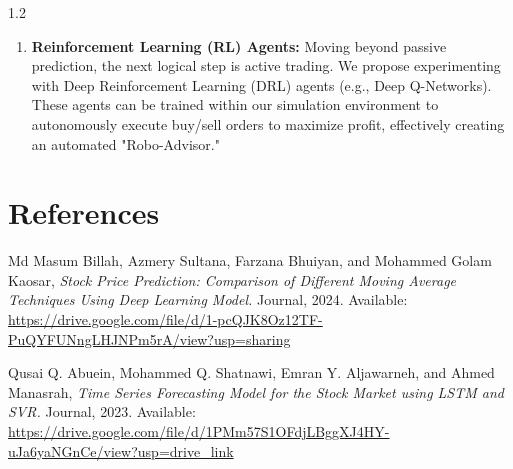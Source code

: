 \documentclass[12pt, a4paper]{report}
\begin{document}
\begin{spacing}{1.2}
\begin{enumerate}
    \item \textbf{Reinforcement Learning (RL) Agents:} 
    Moving beyond passive prediction, the next logical step is active trading. We propose experimenting with Deep Reinforcement Learning (DRL) agents (e.g., Deep Q-Networks). These agents can be trained within our simulation environment to autonomously execute buy/sell orders to maximize profit, effectively creating an automated "Robo-Advisor."
\end{enumerate}

\vspace{-3cm}
\renewcommand{\bibname}{}%


\chapter*{References}

\vspace{-0.8cm}

\begingroup
\footnotesize

\def\UrlBreaks{\do\/\do-\do\_\do\?\do\=\do\&\do\a\do\b\do\c\do\d\do\e\do\f\do\g\do\h\do\i\do\j\do\k\do\l\do\m\do\n\do\o\do\p\do\q\do\r\do\s\do\t\do\u\do\v\do\w\do\x\do\y\do\z\do\A\do\B\do\C\do\D\do\E\do\F\do\G\do\H\do\I\do\J\do\K\do\L\do\M\do\N\do\O\do\P\do\Q\do\R\do\S\do\T\do\U\do\V\do\W\do\X\do\Y\do\Z\do\0\do\1\do\2\do\3\do\4\do\5\do\6\do\7\do\8\do\9}

\begin{enumerate}[label={[ \arabic* ]}]

\item Md Masum Billah, Azmery Sultana, Farzana Bhuiyan, and Mohammed Golam Kaosar,
\textit{Stock Price Prediction: Comparison of Different Moving Average Techniques Using Deep Learning Model.}
Journal, 2024.  
Available: \url{https://drive.google.com/file/d/1-pcQJK8Oz12TF-PuQYFUNngLHJNPm5rA/view?usp=sharing}

\item Qusai Q. Abuein, Mohammed Q. Shatnawi, Emran Y. Aljawarneh, and Ahmed Manasrah,
\textit{Time Series Forecasting Model for the Stock Market using LSTM and SVR.}
Journal, 2023.  
Available: \url{https://drive.google.com/file/d/1PMm57S1OFdjLBggXJ4HY-uJa6yaNGnCe/view?usp=drive_link}


\end{enumerate}
\end{spacing}
\end{document}
